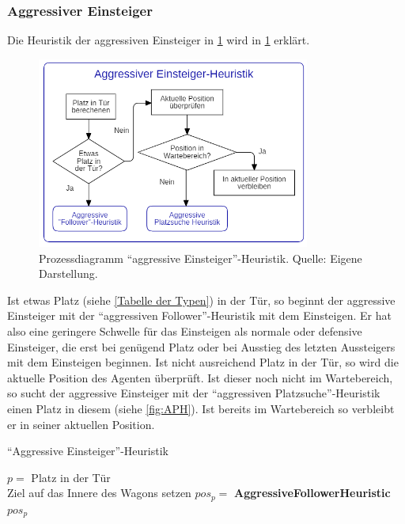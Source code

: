 \subsubsection{Aggressiver Einsteiger}
Die Heuristik der aggressiven Einsteiger in \figurename \ref{fig:AEH} wird in \ref{fig:AEH} erklärt.
\begin{figure}[H]
	\centering
		\includegraphics[width=0.8\textwidth]{pictures/model/algorithm/boarding/aggressive_boarding/aggressive_boarding_heuristic.png}
	\caption{Prozessdiagramm "`aggressive Einsteiger"'-Heuristik. Quelle: Eigene Darstellung.}
	\label{fig:AEH}
\end{figure}
Ist etwas Platz (siehe \ref{Tabelle der Typen}) in der Tür, so beginnt der aggressive Einsteiger mit der "`aggressiven Follower"'-Heuristik mit dem Einsteigen. Er hat also eine geringere Schwelle für das Einsteigen als normale oder defensive Einsteiger, die erst bei genügend Platz oder bei Ausstieg des letzten Aussteigers mit dem Einsteigen beginnen. Ist nicht ausreichend Platz in der Tür, so wird die aktuelle Position des Agenten überprüft. Ist dieser noch nicht im Wartebereich, so sucht der aggressive Einsteiger mit der "`aggressiven Platzsuche"'-Heuristik einen Platz in diesem (siehe \figurename \ref{fig:APH}). Ist bereits im Wartebereich so verbleibt er in seiner aktuellen Position.

\begin{algorithm} [H]
	\caption{"`Aggressive Einsteiger"'-Heuristik}
	
	\AggressiveBoardingHeuristic{} {
		$p=$ Platz in der Tür\\
		 {
			Ziel auf das Innere des Wagons setzen
			$pos_p = $ \textbf{AggressiveFollowerHeuristic}
		} 
		\Return $pos_p$
	}
\end{algorithm}

